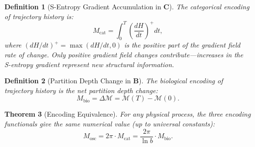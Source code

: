 \documentclass[twocolumn,10pt]{article}
\newtheorem{theorem}{Theorem}[section]
\newtheorem{definition}[theorem]{Definition}
\theoremstyle{remark}
\newcommand{\Depth}{\mathcal{M}}
\newcommand{\CatC}{\mathbf{C}}
\newcommand{\CatB}{\mathbf{B}}
\begin{document}
\begin{definition}[S-Entropy Gradient Accumulation in $\CatC$]
\label{def:memory_C}
The categorical encoding of trajectory history is:
\begin{equation}
M_{\mathrm{cat}} = \int_0^T \left(\frac{dH}{dt}\right)^{\!+} dt,
\label{eq:M_cat}
\end{equation}
where $(dH/dt)^+ = \max(dH/dt, 0)$ is the positive part of the gradient field rate of change.
Only \emph{positive} gradient field changes contribute---increases in the S-entropy gradient represent new structural information.
\end{definition}

\begin{definition}[Partition Depth Change in $\CatB$]
\label{def:memory_B}
The biological encoding of trajectory history is the net partition depth change:
\begin{equation}
M_{\mathrm{bio}} = \Delta\Depth = \Depth(T) - \Depth(0).
\label{eq:M_bio}
\end{equation}
\end{definition}

\begin{theorem}[Encoding Equivalence]
\label{thm:memory_equiv}
For any physical process, the three encoding functionals give the same numerical value (up to universal constants):
\begin{equation}
M_{\mathrm{osc}} = 2\pi \cdot M_{\mathrm{cat}} = \frac{2\pi}{\ln b} \cdot M_{\mathrm{bio}}.
\label{eq:memory_equivalence}
\end{equation}
\end{theorem}
\end{document}
